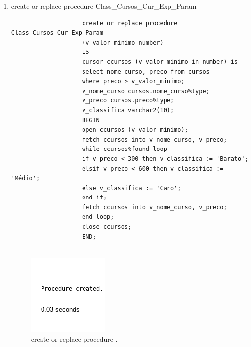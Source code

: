 \documentclass[
article,			%
11pt,				%
oneside,			%
a4paper,			%
english,			%
brazil,				%
sumario=tradicional
]{abntex2}
\begin{document}
\begin{enumerate}
					\item 	create or replace procedure Class\_Cursos\_Cur\_Exp\_Param
					\begin{verbatim}
					create or replace procedure Class_Cursos_Cur_Exp_Param
					(v_valor_minimo number)
					IS
					cursor ccursos (v_valor_minimo in number) is
					select nome_curso, preco from cursos
					where preco > v_valor_minimo;
					v_nome_curso cursos.nome_curso%type;
					v_preco cursos.preco%type;
					v_classifica varchar2(10);
					BEGIN
					open ccursos (v_valor_minimo);
					fetch ccursos into v_nome_curso, v_preco;
					while ccursos%found loop
					if v_preco < 300 then v_classifica := 'Barato';
					elsif v_preco < 600 then v_classifica := 'Médio';
					else v_classifica := 'Caro';
					end if;
					fetch ccursos into v_nome_curso, v_preco;
					end loop;
					close ccursos;
					END;
					
					\end{verbatim}
					
					
					\begin{center}
						\begin{figure}[H]
							\centering
							\includegraphics[scale=0.5]{./imagens/39.png}
							\caption{create or replace procedure .}
							\label{rota-1}
						\end{figure}
					\end{center}
					
	\end{enumerate}				
			
\end{document}
